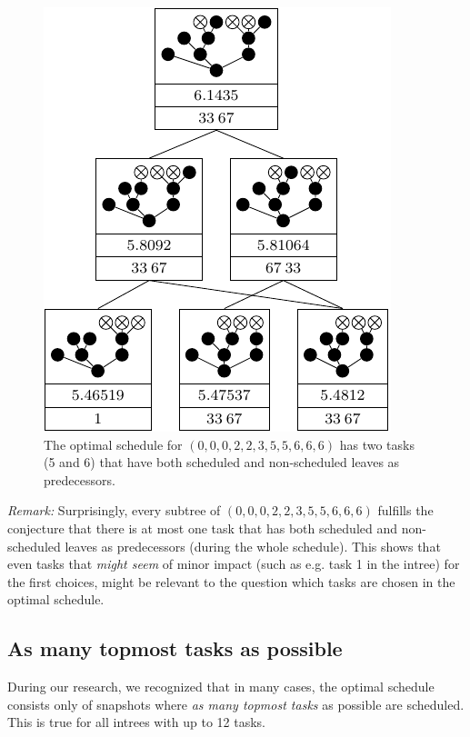 \begin{figure}[th]
  \centering
  \includegraphics{p3/suboptimal/00022355666_optimal_no_fill_up.pdf}
  \caption{The optimal schedule for $(0,0,0,2,2,3,5,5,6,6,6)$ has two tasks (5 and 6) that have both scheduled and non-scheduled leaves as predecessors.}
  \label{fig:filling-op-is-not-strictly-optimal}
\end{figure}

\emph{Remark:} Surprisingly, every subtree of $(0,0,0,2,2,3,5,5,6,6,6)$ fulfills the conjecture that there is at most one task that has both scheduled and non-scheduled leaves as predecessors (during the whole schedule). This shows that even tasks that \emph{might seem} of minor impact (such as e.g. task 1 in the intree) for the first choices, might be relevant to the question which tasks are chosen in the optimal schedule.

\subsection{As many topmost tasks as possible}
\label{sec:suboptimal-hlf-refinement-as-many-topmost-possible}

During our research, we recognized that in many cases, the optimal schedule consists only of snapshots where \emph{as many topmost tasks} as possible are scheduled. This is true for all intrees with up to 12 tasks.

